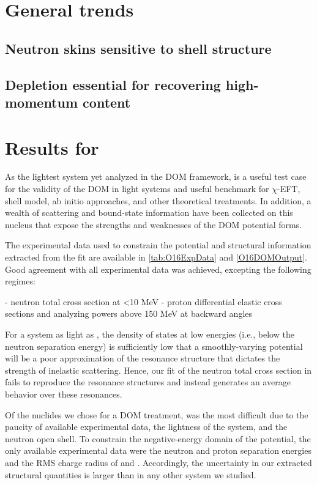 \section{General trends}
\subsection{Neutron skins sensitive to shell structure}
\subsection{Depletion essential for recovering high-momentum content}

\section{Results for \oSixEight}
As the lightest system yet analyzed in the DOM framework, \oSix is a useful test case
for the validity of the DOM in light systems and useful benchmark for $\chi$-EFT, shell model, ab
initio approaches, and other theoretical treatments. In addition, a wealth of scattering and
bound-state information have been collected on this nucleus that expose the strengths and
weaknesses of the DOM potential forms.

The experimental data used to constrain the \oSix potential and structural information extracted
from the fit are available in \ref{tab:O16ExpData} and \ref{O16DOMOutput}. Good agreement with all 
experimental data was achieved, excepting the following regimes:

- neutron total cross section at <10 MeV
- proton differential elastic cross sections and analyzing powers above 150 MeV at backward angles

For a system as light as \oSix, the density of states at low energies (i.e., below the neutron
separation energy) is sufficiently low that a smoothly-varying potential will be a poor
approximation of the resonance structure that dictates the strength of inelastic scattering. Hence,
our fit of the neutron total cross section in \oSix fails to reproduce the resonance structures and
instead generates an average behavior over these resonances.

Of the nuclides we chose for a DOM treatment, \oEight was the most difficult due to the paucity of
available experimental data, the lightness of the system, and the neutron open shell. To constrain the negative-energy domain
of the potential, the only available experimental data were the neutron and proton separation
energies and the RMS charge radius of \oEight and \neEight. Accordingly, the uncertainty in our extracted structural quantities is
larger than in any other system we studied.

